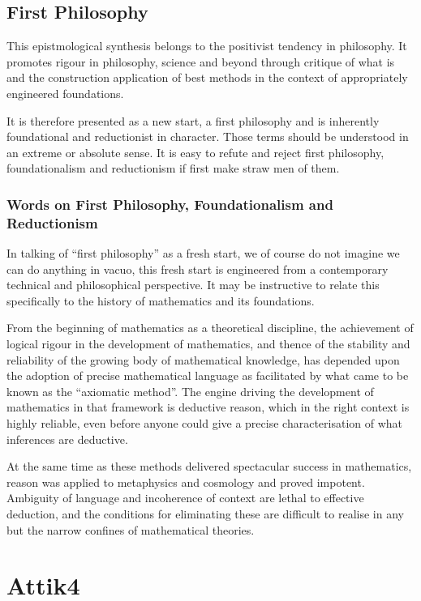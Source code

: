 \documentclass[10pt,titlepage]{book}
\begin{document}
\section{First Philosophy}

This epistmological synthesis belongs to the positivist tendency in philosophy.
It promotes rigour in philosophy, science and beyond through critique of what is and the construction application of best methods in the context of appropriately engineered foundations.

It is therefore presented as a new start, a first philosophy and is inherently foundational and reductionist in character.
Those terms should be understood in an extreme or absolute sense.
It is easy to refute and reject first philosophy, foundationalism and reductionism if first make straw men of them.

\subsection{Words on First Philosophy, Foundationalism and Reductionism}

In talking of ``first philosophy'' as a fresh start, we of course do not imagine we can do anything in vacuo, this fresh start is engineered from a contemporary technical and philosophical perspective.
It may be instructive to relate this specifically to the history of mathematics and its foundations.

From the beginning of mathematics as a theoretical discipline, the achievement of logical rigour in the development of mathematics, and thence of the stability and reliability of the growing body of mathematical knowledge, has depended upon the adoption of precise mathematical language as facilitated by what came to be known as the ``axiomatic method''.
The engine driving the development of mathematics in that framework is deductive reason, which in the right context is highly reliable, even before anyone could give a precise characterisation of what inferences are deductive.

At the same time as these methods delivered spectacular success in mathematics, reason was applied to metaphysics and cosmology and proved impotent.
Ambiguity of language and incoherence of context are lethal to effective deduction, and the conditions for eliminating these are difficult to realise in any but the narrow confines of mathematical theories.


\chapter{Attik4}
\end{document}
